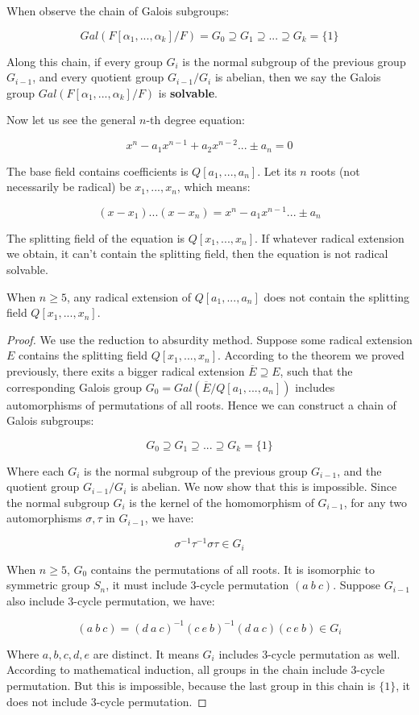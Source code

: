 \documentclass[b5paper]{article}
\begin{document}
When observe the chain of Galois subgroups:

\[
Gal(F[\alpha_1, ..., \alpha_k]/F) = G_0 \supseteq G_1 \supseteq ... \supseteq G_k = \{1\}
\]

Along this chain, if every group $G_i$ is the normal subgroup of the previous group $G_{i-1}$, and every quotient group $G_{i-1}/G_i$ is abelian, then we say the Galois group $Gal(F[\alpha_1, ..., \alpha_k]/F)$ is \textbf{solvable}.

Now let us see the general $n$-th degree equation:

\[
x^n - a_1x^{n-1} + a_2x^{n-2}... \pm a_n = 0
\]

The base field contains coefficients is $Q[a_1, ..., a_n]$. Let its $n$ roots (not necessarily be radical) be $x_1, ..., x_n$, which means:

\[
(x - x_1)...(x - x_n) = x^n - a_1x^{n-1} ... \pm a_n
\]

The splitting field of the equation is $Q[x_1, ..., x_n]$. If whatever radical extension we obtain, it can't contain the splitting field, then the equation is not radical solvable.

\begin{theorem}
When $n \geq 5$, any radical extension of $Q[a_1, ..., a_n]$ does not contain the splitting field $Q[x_1, ..., x_n]$.
\end{theorem}

\begin{proof}
We use the reduction to absurdity method. Suppose some radical extension $E$ contains the splitting field $Q[x_1, ..., x_n]$. According to the theorem we proved previously, there exits a bigger radical extension $\overline{E} \supseteq E$, such that the corresponding Galois group $G_0 = Gal(\overline{E}/Q[a_1, ..., a_n])$ includes automorphisms of permutations of all roots. Hence we can construct a chain of Galois subgroups:

\[
G_0 \supseteq G_1 \supseteq ... \supseteq G_k = \{1\}
\]

Where each $G_i$ is the normal subgroup of the previous group $G_{i-1}$, and the quotient group $G_{i-1}/G_i$ is abelian. We now show that this is impossible. Since the normal subgroup $G_i$ is the kernel of the homomorphism of $G_{i-1}$, for any two automorphisms $\sigma, \tau$ in $G_{i-1}$, we have:

\[
\sigma^{-1}\tau^{-1}\sigma\tau \in G_{i}
\]

When $n \geq 5$, $G_0$ contains the permutations of all roots. It is isomorphic to symmetric group $S_n$, it must include 3-cycle permutation $(a\ b\ c)$. Suppose $G_{i-1}$ also include 3-cycle permutation, we have:

\[
(a\ b\ c) = (d\ a\ c)^{-1}(c\ e\ b)^{-1}(d\ a\ c)(c\ e\ b) \in G_i
\]

Where $a, b, c, d, e$ are distinct. It means $G_i$ includes 3-cycle permutation as well. According to mathematical induction, all groups in the chain include 3-cycle permutation. But this is impossible, because the last group in this chain is $\{1\}$, it does not include 3-cycle permutation.
\end{proof}
\end{document}
